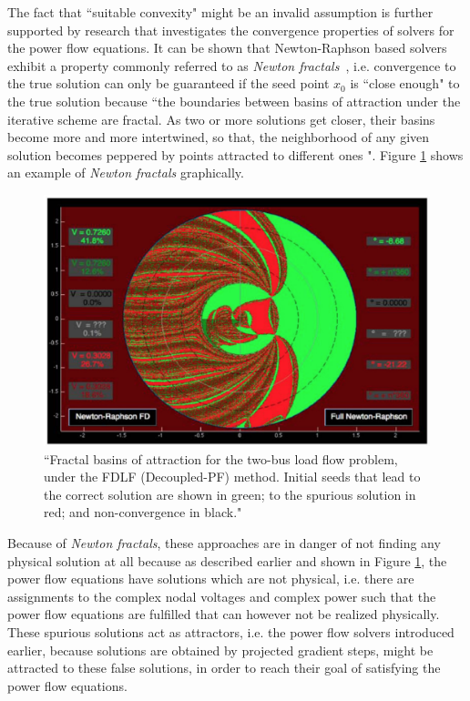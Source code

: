 \documentclass[11pt]{cmuthesis} %
\begin{document}
The fact that ``suitable convexity" might be an invalid assumption is further supported by research that investigates the convergence properties of solvers for the power flow equations. It can be shown that Newton-Raphson based solvers exhibit a property commonly referred to as \emph{Newton fractals}~\cite{klump2000new,thorp1997load}, i.e. convergence to the true solution can only be guaranteed if the seed point $x_0$ is ``close enough" to the true solution because ``the boundaries between 
basins of attraction under the iterative scheme are 
fractal. As two or more solutions get closer, their 
basins become more and more intertwined, so that, 
the neighborhood of any given solution becomes peppered by points attracted to different ones "\cite{trias2012holomorphic}. Figure \ref{fig:fractals} shows an example of \emph{Newton fractals} graphically.\\

\begin{figure}
\includegraphics[width=\linewidth]{fractals.png}
\caption[Fractal basins of attraction for the two-bus load flow problem, under
the FDLF (Decoupled-PF) method.]{``Fractal basins of attraction for the two-bus load flow problem, under
the FDLF (Decoupled-PF) method. Initial seeds that lead to the correct solution are shown in
green; to the spurious solution in red; and non-convergence in black."~\cite{trias2012holomorphic}}
\label{fig:fractals}
\end{figure}

Because of \emph{Newton fractals}, these approaches are in danger of not finding any physical solution at all because as described earlier and shown in Figure \ref{fig:fractals}, the power flow equations have solutions which are not physical, i.e. there are assignments to the complex nodal voltages and complex power such that the power flow equations are fulfilled that can however not be realized physically. These spurious solutions act as attractors, i.e. the power flow solvers introduced earlier, because solutions are obtained by projected gradient steps, might be attracted to these false solutions, in order to reach their goal of satisfying the power flow equations.\\
\end{document}
